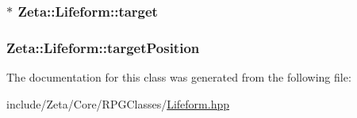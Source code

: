 \hypertarget{classZeta_1_1Lifeform_a1b7a44ef56356f249876dd8be09276ba}{
\subsubsection[{target}]{$\ast$ Zeta\+::\+Lifeform\+::target\hspace{0.3cm}{\ttfamily [protected]}}}\label{classZeta_1_1Lifeform_a1b7a44ef56356f249876dd8be09276ba}
\hypertarget{classZeta_1_1Lifeform_a96335354b0e3994fcee2c0c09822862b}{
\subsubsection[{target\+Position}]{ Zeta\+::\+Lifeform\+::target\+Position\hspace{0.3cm}{\ttfamily [protected]}}}\label{classZeta_1_1Lifeform_a96335354b0e3994fcee2c0c09822862b}


The documentation for this class was generated from the following file\+:\begin{DoxyCompactItemize}
\item 
include/\+Zeta/\+Core/\+R\+P\+G\+Classes/\hyperlink{Lifeform_8hpp}{Lifeform.\+hpp}\end{DoxyCompactItemize}
